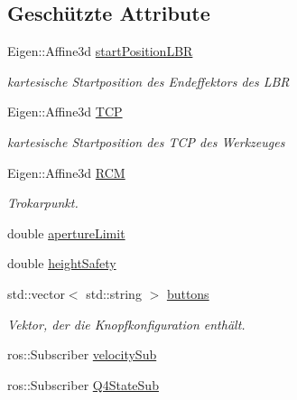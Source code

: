 \subsection*{Geschützte Attribute}
\begin{DoxyCompactItemize}
\item 
\hypertarget{classICommander_af6a774cc1d571b4858ebae680d1f0939}{Eigen\-::\-Affine3d \hyperlink{classICommander_af6a774cc1d571b4858ebae680d1f0939}{start\-Position\-L\-B\-R}}\label{classICommander_af6a774cc1d571b4858ebae680d1f0939}

\begin{DoxyCompactList}\small\item\em kartesische Startposition des Endeffektors des L\-B\-R \end{DoxyCompactList}\item 
\hypertarget{classICommander_a8762a3ea77233f9700166908ad4d1987}{Eigen\-::\-Affine3d \hyperlink{classICommander_a8762a3ea77233f9700166908ad4d1987}{T\-C\-P}}\label{classICommander_a8762a3ea77233f9700166908ad4d1987}

\begin{DoxyCompactList}\small\item\em kartesische Startposition des T\-C\-P des Werkzeuges \end{DoxyCompactList}\item 
\hypertarget{classICommander_aec4eecfaa992cfb2ede1f1d339548326}{Eigen\-::\-Affine3d \hyperlink{classICommander_aec4eecfaa992cfb2ede1f1d339548326}{R\-C\-M}}\label{classICommander_aec4eecfaa992cfb2ede1f1d339548326}

\begin{DoxyCompactList}\small\item\em Trokarpunkt. \end{DoxyCompactList}\item 
double \hyperlink{classICommander_a01ec4010dc037bfb600cee7f0be9311c}{aperture\-Limit}
\item 
double \hyperlink{classICommander_a166295c90210dae6c74e96d749c8ea1a}{height\-Safety}
\item 
std\-::vector$<$ std\-::string $>$ \hyperlink{classICommander_a038f78434eb525d73414c84624d3c3e4}{buttons}
\begin{DoxyCompactList}\small\item\em Vektor, der die Knopfkonfiguration enthält. \end{DoxyCompactList}\item 
ros\-::\-Subscriber \hyperlink{classICommander_a77d12525f98994352e2f2a450e04305b}{velocity\-Sub}
\item 
\hypertarget{classICommander_aaf7b291fe6f704d0a05ca9c51c00eee5}{ros\-::\-Subscriber \hyperlink{classICommander_aaf7b291fe6f704d0a05ca9c51c00eee5}{Q4\-State\-Sub}}\label{classICommander_aaf7b291fe6f704d0a05ca9c51c00eee5}


\end{DoxyCompactItemize}
